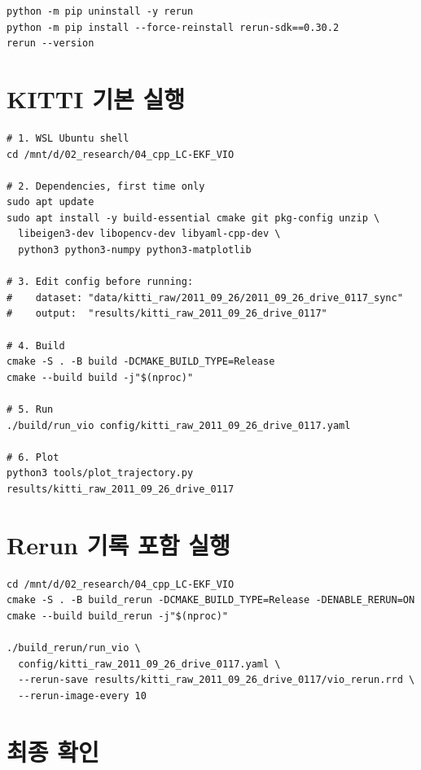 \documentclass[11pt,a4paper,oneside]{report}
\begin{document}
\begin{lstlisting}[style=shell,caption={잘못된 rerun 패키지 충돌 해결}]
python -m pip uninstall -y rerun
python -m pip install --force-reinstall rerun-sdk==0.30.2
rerun --version
\end{lstlisting}

\section{KITTI 기본 실행}

\begin{lstlisting}[style=shell,caption={처음부터 실행까지}]
# 1. WSL Ubuntu shell
cd /mnt/d/02_research/04_cpp_LC-EKF_VIO

# 2. Dependencies, first time only
sudo apt update
sudo apt install -y build-essential cmake git pkg-config unzip \
  libeigen3-dev libopencv-dev libyaml-cpp-dev \
  python3 python3-numpy python3-matplotlib

# 3. Edit config before running:
#    dataset: "data/kitti_raw/2011_09_26/2011_09_26_drive_0117_sync"
#    output:  "results/kitti_raw_2011_09_26_drive_0117"

# 4. Build
cmake -S . -B build -DCMAKE_BUILD_TYPE=Release
cmake --build build -j"$(nproc)"

# 5. Run
./build/run_vio config/kitti_raw_2011_09_26_drive_0117.yaml

# 6. Plot
python3 tools/plot_trajectory.py results/kitti_raw_2011_09_26_drive_0117
\end{lstlisting}

\section{Rerun 기록 포함 실행}

\begin{lstlisting}[style=shell,caption={Rerun 선택 실행}]
cd /mnt/d/02_research/04_cpp_LC-EKF_VIO
cmake -S . -B build_rerun -DCMAKE_BUILD_TYPE=Release -DENABLE_RERUN=ON
cmake --build build_rerun -j"$(nproc)"

./build_rerun/run_vio \
  config/kitti_raw_2011_09_26_drive_0117.yaml \
  --rerun-save results/kitti_raw_2011_09_26_drive_0117/vio_rerun.rrd \
  --rerun-image-every 10
\end{lstlisting}

\section{최종 확인}
\end{document}
